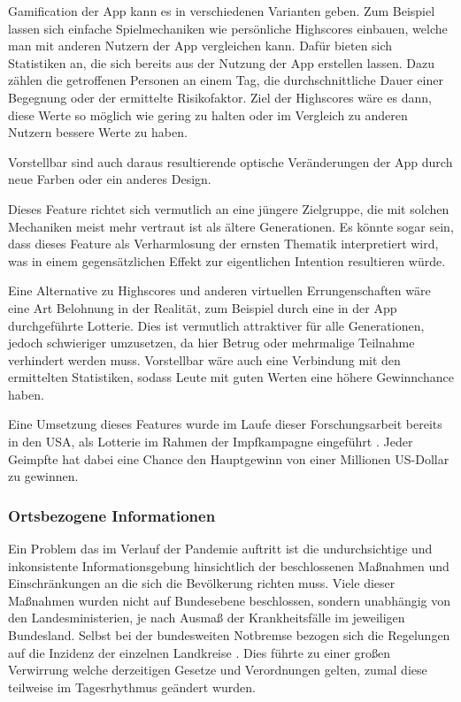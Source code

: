 \documentclass[conference,compsoc]{IEEEtran}
\begin{document}
Gamification der App kann es in verschiedenen Varianten geben. 
Zum Beispiel lassen sich einfache Spielmechaniken wie persönliche Highscores einbauen, welche man mit anderen Nutzern der App vergleichen kann. 
Dafür bieten sich Statistiken an, die sich bereits aus der Nutzung der App erstellen lassen. 
Dazu zählen die getroffenen Personen an einem Tag, die durchschnittliche Dauer einer Begegnung oder der ermittelte Risikofaktor. 
Ziel der Highscores wäre es dann, diese Werte so möglich wie gering zu halten oder im Vergleich zu anderen Nutzern bessere Werte zu haben.

Vorstellbar sind auch daraus resultierende optische Veränderungen der App durch neue Farben oder ein anderes Design.

Dieses Feature richtet sich vermutlich an eine jüngere Zielgruppe, die mit solchen Mechaniken meist mehr vertraut ist als ältere Generationen.
Es könnte sogar sein, dass dieses Feature als Verharmlosung der ernsten Thematik interpretiert wird, was in einem gegensätzlichen Effekt zur eigentlichen Intention resultieren würde.

Eine Alternative zu Highscores und anderen virtuellen Errungenschaften wäre eine Art Belohnung in der Realität, zum Beispiel durch eine in der App durchgeführte Lotterie.
Dies ist vermutlich attraktiver für alle Generationen, jedoch schwieriger umzusetzen, da hier Betrug oder mehrmalige Teilnahme verhindert werden muss. 
Vorstellbar wäre auch eine Verbindung mit den ermittelten Statistiken, sodass Leute mit guten Werten eine höhere Gewinnchance haben.

Eine Umsetzung dieses Features wurde im Laufe dieser Forschungsarbeit bereits in den USA, als Lotterie im Rahmen der Impfkampagne eingeführt \cite{Lotto}.
Jeder Geimpfte hat dabei eine Chance den Hauptgewinn von einer Millionen US-Dollar zu gewinnen.\\

\subsubsection{Ortsbezogene Informationen}
Ein Problem das im Verlauf der Pandemie auftritt ist die undurchsichtige und inkonsistente Informationsgebung 
hinsichtlich der beschlossenen Maßnahmen und Einschränkungen an die sich die Bevölkerung richten muss. 
Viele dieser Maßnahmen wurden nicht auf Bundesebene beschlossen, sondern unabhängig von den Landesministerien, je nach Ausmaß der Krankheitsfälle im jeweiligen Bundesland.
Selbst bei der bundesweiten Notbremse bezogen sich die Regelungen auf die Inzidenz der einzelnen Landkreise \cite{Notbremse}.
Dies führte zu einer großen Verwirrung welche derzeitigen Gesetze und Verordnungen gelten, zumal diese teilweise im Tagesrhythmus geändert wurden.
\end{document}

